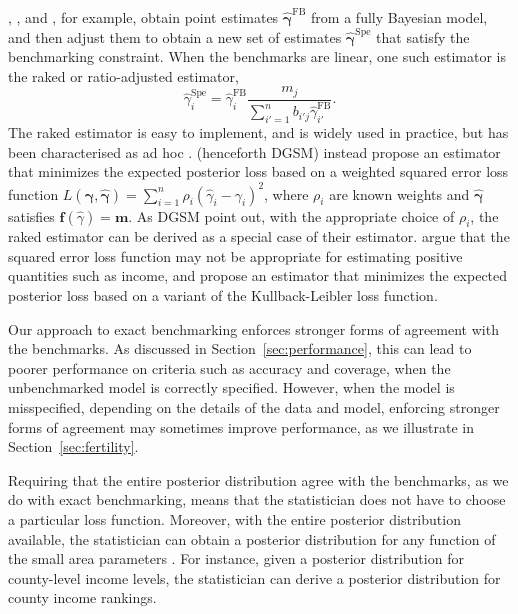 \documentclass[12pt]{article}
\begin{document}
\citet{you2004benchmarking}, \citet{datta2011bayesian}, and \citet{ghosh2015benchmarked}, for example, obtain point estimates $\hat{\bm{\gamma}}^{\text{FB}}$ from a fully Bayesian model, and then adjust them to obtain a new set of estimates $\hat{\bm{\gamma}}^{\text{Spe}}$ that satisfy the benchmarking constraint.  When the benchmarks are linear, one such estimator is the raked or ratio-adjusted estimator,
\begin{equation}
  \hat{\gamma}_i^{\text{Spe}}=\hat{\gamma}_{i}^{\text{FB}}\frac{m_j}{\sum_{i'=1}^n b_{i'j}\hat{\gamma}_{i'}^{\text{FB}}}. \label{eq:raked}
\end{equation}
The raked estimator is easy to implement, and is widely used in practice, but has been characterised as ad hoc \citep{ghosh2015benchmarked}.  \citet{datta2011bayesian} (henceforth DGSM) instead  propose an estimator that minimizes the expected posterior loss based on a weighted squared error loss function $L(\bm{\gamma},\hat{\bm{\gamma}})=\sum_{i=1}^n \rho_i(\hat{\gamma}_i-\gamma_i)^2$, where $\rho_i$ are known weights and $\hat{\bm{\gamma}}$ satisfies $\bm{f}(\hat{\gamma})=\bm{m}$.  As DGSM  point out, with the appropriate choice of $\rho_i$, the raked estimator can be derived as a special case of their estimator.  \citet{ghosh2015benchmarked} argue that the squared error loss function may not be appropriate for estimating positive quantities such as income, and propose an estimator that minimizes the expected posterior loss based on a variant of the Kullback-Leibler loss function.

Our approach to exact benchmarking enforces stronger forms of agreement with the benchmarks. As discussed in Section~\ref{sec:performance}, this can lead to poorer performance on criteria such as accuracy and coverage, when the unbenchmarked model is correctly specified.  However, when the model is misspecified, depending on the details of the data and model, enforcing stronger forms of agreement may sometimes improve performance, as we illustrate in Section~\ref{sec:fertility}.

Requiring that the entire posterior distribution agree with the benchmarks, as we do with exact benchmarking, means that the statistician does not have to choose a particular loss function.  Moreover, with the entire posterior distribution available, the statistician can obtain a posterior distribution for any function of the small area parameters \citep[][pp 261-262]{gelman2014bayesian}.  For instance, given a posterior distribution for county-level income levels, the statistician can derive a posterior distribution for county income rankings.
\end{document}
